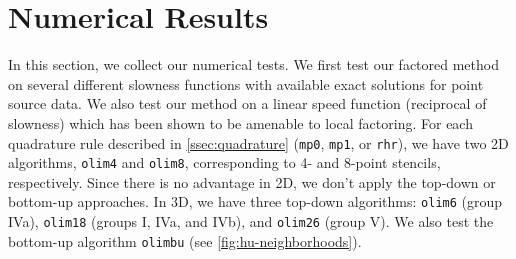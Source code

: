 \documentclass[sisc-eikonal.tex]{subfiles}
\begin{document}
\section{Numerical Results}\label{sec:numerical-results} In this
section, we collect our numerical tests. We first test our factored
method on several different slowness functions with available exact
solutions for point source data. We also test our method on a linear
speed function (reciprocal of slowness) which has been shown to be
amenable to local factoring. For each quadrature rule described in
\cref{ssec:quadrature} (\texttt{mp0}, \texttt{mp1}, or \texttt{rhr}),
we have two 2D algorithms, \texttt{olim4} and \texttt{olim8},
corresponding to 4- and 8-point stencils, respectively. Since there is
no advantage in 2D, we don't apply the top-down or bottom-up
approaches. In 3D, we have three top-down algorithms: \texttt{olim6}
(group IVa), \texttt{olim18} (groups I, IVa, and IVb), and
\texttt{olim26} (group V). We also test the bottom-up algorithm
\texttt{olimbu} (see \cref{fig:hu-neighborhoods}).
\end{document}
